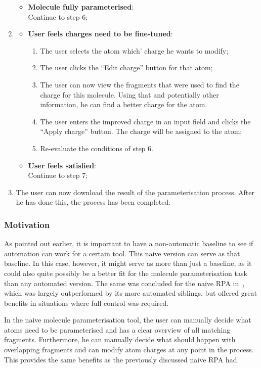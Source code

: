 \begin{enumerate}[itemsep=.1em, parsep=.2em, topsep=0em]
\begin{itemize}[leftmargin=0cm, itemsep=.1em, parsep=.1em]
  \item[] {\bf Molecule fully parameterised}:\\Continue to step 6;
  \end{itemize}
\item
  \begin{itemize}[leftmargin=0cm, itemsep=.1em, parsep=.1em]
  \item[] {\bf User feels charges need to be fine-tuned}:
    \begin{enumerate}
    \item The user selects the atom which' charge he wants to modify;
    \item The user clicks the ``Edit charge'' button for that atom;
    \item The user can now view the fragments that were used to find the charge for this molecule. Using that and potentially other information, he can find a better charge for the atom.
    \item The user enters the improved charge in an input field and clicks the ``Apply charge'' button. The charge will be assigned to the atom;
    \item Re-evaluate the conditions of step 6.
    \end{enumerate}
  \item[]{\bf User feels satisfied}:\\Continue to step 7;
  \end{itemize}
\item The user can now download the result of the parameterisation process. After he has done this, the process has been completed.
\end{enumerate}

\subsubsection{Motivation}
As pointed out earlier, it is important to have a non-automatic baseline to see if automation can work for a certain tool. This naive version can serve as that baseline. In this case, however, it might serve as more than just a baseline, as it could also quite possibly be a better fit for the molecule parameterisation task than any automated version. The same was concluded for the naive RPA in~\cite{payne2000varying}, which was largely outperformed by its more automated siblings, but offered great benefits in situations where full control was required.

In the naive molecule parameterisation tool, the user can manually decide what atoms need to be parameterised and has a clear overview of all matching fragments. Furthermore, he can manually decide what should happen with overlapping fragments and can modify atom charges at any point in the process. This provides the same benefits as the previously discussed naive RPA had.

